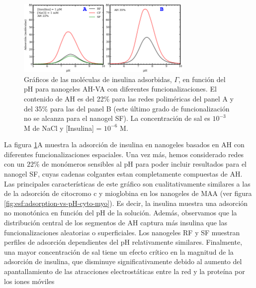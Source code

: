\begin{figure}[!htb]
    \centering
    \includegraphics[width=0.75\textwidth]{Figures/graphs-gel2/insu-PAH.pdf}
    \caption{Gr\'aficos de las mol\'eculas de insulina adsorbidas, $\Gamma$, en funci\'on del pH para nanogeles AH-VA con diferentes funcionalizaciones.
    	El contenido de AH es del 22\% para las redes polim\'ericas del panel A y del 35\% para las del panel B (este \'ultimo grado de funcionalizaci\'on no se alcanza para el nanogel SF).
    	 La concentraci\'on de sal es $10^{-3}$ M de NaCl y [Insulina] = $10^{-6}$ M.}
    \label{fig:esf:adsorption-vs-pH-insulin}
\end{figure}




La figura \ref{fig:esf:adsorption-vs-pH-insulin}A muestra la adsorci\'on de insulina en nanogeles basados en AH con diferentes funcionalizaciones espaciales.
Una vez m\'as, hemos considerado redes con un $22\%$ de mon\'omeros sensibles al pH para poder incluir resultados para el nanogel SF, cuyas cadenas colgantes estan completamente compuestas  de AH. 
Las principales caracter\'isticas de este gr\'afico son cualitativamente similares a las de la adsorci\'on de citocromo c y mioglobina en los nanogeles de MAA (ver figura \ref{fig:esf:adsorption-vs-pH-cyto-myo}).
Es decir, la insulina muestra una adsorci\'on no monot\'onica en funci\'on del pH de la soluci\'on.
Adem\'as, observamos que la distribuci\'on central de los segmentos de AH captura m\'as insulina que las funcionalizaciones aleatorias o superficiales.
Los nanogeles RF y SF muestran perfiles de adsorci\'on dependientes del pH relativamente similares.
Finalmente, una mayor concentraci\'on de sal tiene un efecto cr\'itico en la magnitud de la adsorci\'on de insulina, que disminuye significativamente debido al aumento del apantallamiento de las atracciones electrost\'aticas entre la red y la prote\'ina por los iones m\'oviles

